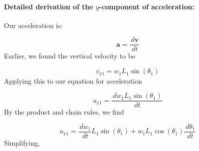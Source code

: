 \documentclass[12pt]{article}
\begin{document}
\paragraph{Detailed derivation of the $y$-component of acceleration:}
\label{GD:accelerationY1Deriv}
Our acceleration is:

\begin{displaymath}
\symbf{a}=\frac{\,d\symbf{v}}{\,dt}
\end{displaymath}
Earlier, we found the vertical velocity to be

\begin{displaymath}
{v_{\text{y}1}}={w_{1}} {L_{1}} \sin\left({θ_{1}}\right)
\end{displaymath}
Applying this to our equation for acceleration

\begin{displaymath}
{a_{\text{y}1}}=\frac{\,d{w_{1}} {L_{1}} \sin\left({θ_{1}}\right)}{\,dt}
\end{displaymath}
By the product and chain rules, we find

\begin{displaymath}
{a_{\text{y}1}}=\frac{\,d{w_{1}}}{\,dt} {L_{1}} \sin\left({θ_{1}}\right)+{w_{1}} {L_{1}} \cos\left({θ_{1}}\right) \frac{\,d{θ_{1}}}{\,dt}
\end{displaymath}
Simplifying,
\end{document}
